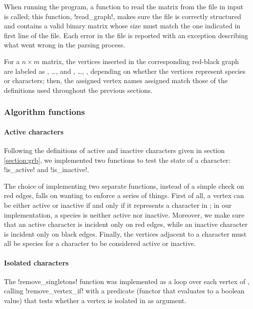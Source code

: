 When running the program, a function to read the matrix from the file in input is called; this function, !read_graph!, makes sure the file is correctly structured and contains a valid binary matrix whose size must match the one indicated in first line of the file.
Each error in the file is reported with an exception describing what went wrong in the parsing process.

For a $n \times m$ matrix, the vertices inserted in the corresponding red-black graph \grb{} are labeled as \species[0], \dots, \species[n-1] and \character[0], \dots, \character[m-1], depending on whether the vertices represent species or characters; then, the assigned vertex names assigned match those of the definitions used throughout the previous sections.

\subsubsection*{Algorithm functions}


\paragraph{Active characters}

Following the definitions of active and inactive characters given in section \ref{section:grb}, we implemented two functions to test the state of a character: !is_active! and !is_inactive!.

The choice of implementing two separate functions, instead of a simple check on red edges, falls on wanting to enforce a series of things.
First of all, a vertex can be either active or inactive if and only if it represents a character in \grb{}; in our implementation, a species is neither active nor inactive.
Moreover, we make sure that an active character is incident only on red edges, while an inactive character is incident only on black edges.
Finally, the vertices adjacent to a character must all be species for a character to be considered active or inactive.

\paragraph{Isolated characters}

The !remove_singletons! function was implemented as a loop over each vertex of \grb{}, calling !remove_vertex_if! with a predicate (functor that evaluates to a boolean value) that tests whether a vertex is isolated in \grb{} as argument.

